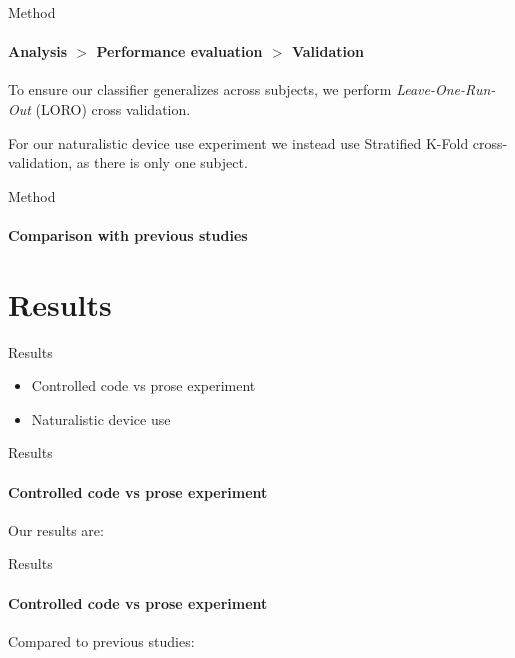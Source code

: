 \documentclass[xcolor={dvipsnames,table},12pt]{beamer}
\newif\ifplacelogo{}  %
\begin{document}
\begin{frame}{Method}
    \framesubtitle{Analysis $>$ Performance evaluation $>$ Validation}
    To ensure our classifier generalizes across subjects, we perform \emph{Leave-One-Run-Out} (LORO) cross validation.

    \begin{adjustbox}{width=0.6\textwidth, center, float=table}
        
    \end{adjustbox}

    For our naturalistic device use experiment we instead use Stratified K-Fold cross-validation, as there is only one subject.
\end{frame}

\placelogofalse{}
\begin{frame}{Method}
    \framesubtitle{Comparison with previous studies}
    \vspace*{-10mm}
    \begin{adjustbox}{width=\textwidth,center,float=table}
        
    \end{adjustbox}
\end{frame}
\placelogotrue{}

\section{Results}
\begin{frame}{Results}
    \begin{itemize}
        \item Controlled code vs prose experiment
        \item Naturalistic device use
    \end{itemize}
\end{frame}

\begin{frame}{Results}
    \framesubtitle{Controlled code vs prose experiment}
    Our results are:
    {
        \small
        
    }
\end{frame}

\begin{frame}{Results}
    \framesubtitle{Controlled code vs prose experiment}
    Compared to previous studies:
    {
        \small
        
    }
\end{frame}
\end{document}
